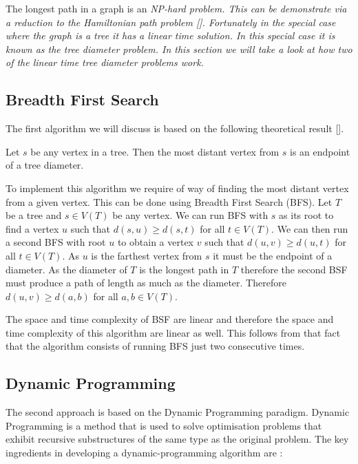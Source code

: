 The longest path in a graph is an \em NP-hard \em problem. This can be demonstrate via a reduction to the Hamiltonian path problem []. Fortunately in the special case where the graph is a tree it has a linear time solution. In this special case it is known as the tree diameter problem. In this section we will take a look at how two of the linear time tree diameter problems work.


\subsection{Breadth First Search}

The first algorithm we will discuss is based on the following theoretical result [].

\begin{lem} Let $s$ be any vertex in a tree. Then the most distant vertex from $s$ is an endpoint of a tree diameter. \end{lem}

    To implement this algorithm we require of way of finding the most distant vertex from a given vertex. This can be done using Breadth First Search (BFS). Let $T$ be a tree and $s \in V(T)$ be any vertex. We can run BFS with $s$ as its root to find a vertex $u$ such that $d(s, u) \ge d(s, t)$ for all $t \in V(T)$. We can then run a second BFS with root $u$ to obtain a vertex $v$ such that $d(u, v) \ge d(u, t)$ for all $t \in V(T)$. As $u$ is the farthest vertex from $s$ it must be the endpoint of a diameter. As the diameter of $T$ is the longest path in $T$ therefore the second BSF must produce a path of length as much as the diameter. Therefore $d(u, v) \ge d(a, b)$ for all $a,b \in V(T)$.

The space and time complexity of BSF are linear \cite{intro-to-algo} and therefore the space and time complexity of this algorithm are linear as well. This follows from that fact that the algorithm consists of running BFS just two consecutive times.

\subsection{Dynamic Programming}

The second approach is based on the Dynamic Programming paradigm. Dynamic Programming is a method that is used to solve optimisation problems that exhibit recursive substructures of the same type as the original problem. The key ingredients in developing a dynamic-programming algorithm are \cite{intro-to-algo}:


